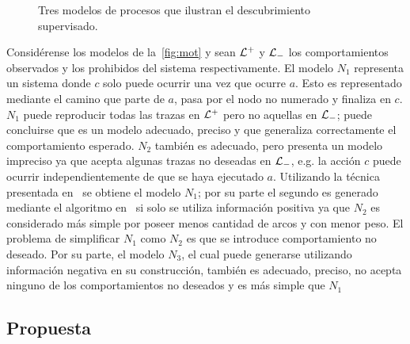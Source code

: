 \begin{example}
    \begin{figure}[t]
        \centering
        \hspace{10mm}
        \hspace{10mm}
        \hspace{10mm}
        \subbottom[\label{sfig:mot.4}]{\scalebox{.9}{}}
        \caption{Tres modelos de procesos que ilustran el descubrimiento supervisado.}
        \label{fig:mot}
    \end{figure}

    Considérense los modelos de la~\autoref{fig:mot} y sean ${\mathcal L}^+$ y ${\mathcal L}_-$ los 
    comportamientos observados y los prohibidos del sistema respectivamente.
    El modelo $N_1$ representa un sistema donde $c$ solo puede ocurrir una vez
    que ocurre $a$.%
    Esto es representado mediante el camino que parte de $a$, pasa por el nodo no
    numerado y finaliza en $c$.
    $N_1$ puede reproducir todas las trazas en ${\mathcal L}^+$ pero no aquellas en ${\mathcal L}_-$; puede
    concluirse que es un modelo adecuado, preciso y que generaliza correctamente el comportamiento
    esperado. $N_2$ también es adecuado, pero presenta un modelo impreciso ya que acepta 
    algunas trazas no deseadas en ${\mathcal L}_-$, e.g. la acción $c$ puede ocurrir independientemente de que 
    se haya ejecutado $a$. Utilizando la técnica presentada en~\cite{CarmonaC14} se obtiene el 
    modelo $N_1$; por su parte  el segundo es generado mediante el algoritmo en~\cite{LeonCB15} si solo
    se utiliza información positiva ya que $N_2$ es considerado más simple por poseer menos 
    cantidad de arcos y con menor peso. El problema de simplificar $N_1$ como $N_2$ es que se introduce
    comportamiento no deseado.
    Por su parte, el modelo $N_3$, el cual puede generarse utilizando información negativa en su construcción,
    también es adecuado, preciso, no acepta ninguno de los comportamientos no deseados y es más simple que $N_1$
\end{example}

\subsection*{Propuesta}
\label{sec:propposal}

